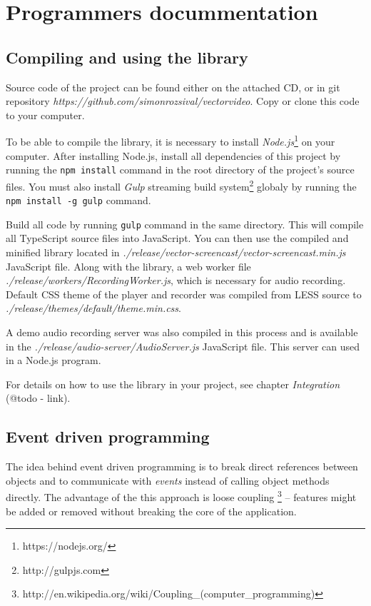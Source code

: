 \chapter{Programmers docummentation}

\section{Compiling and using the library}

Source code of the project can be found either on the attached CD, or in git repository \textit{https://github.com/simonrozsival/vectorvideo}. Copy or clone this code to your computer.

To be able to compile the library, it is necessary to install \textit{Node.js}\footnote{https://nodejs.org/} on your computer. After installing Node.js, install all dependencies of this project by running the \verb|npm install| command in the root directory of the project's source files. You must also install \textit{Gulp} streaming build system\footnote{http://gulpjs.com} globaly by running the \verb|npm install -g gulp| command.

Build all code by running \verb|gulp| command in the same directory. This will compile all TypeScript source files into JavaScript. You can then use the compiled and minified library located in \textit{./release/vector-screencast/vector-screencast.min.js} JavaScript file. Along with the library, a web worker file \textit{./release/workers/RecordingWorker.js}, which is necessary for audio recording. Default CSS theme of the player and recorder was compiled from LESS source to \textit{./release/themes/default/theme.min.css}.

A demo audio recording server was also compiled in this process and is available in the \textit{./release/audio-server/AudioServer.js} JavaScript file. This server can used in a Node.js program.

For details on how to use the library in your project, see chapter \textit{Integration} (@todo - link).



\section{Event driven programming}
The idea behind event driven programming is to break direct references between objects and to communicate with \textit{events} instead of calling object methods directly. The advantage of the this approach is loose coupling \footnote{http://en.wikipedia.org/wiki/Coupling\_(computer\_programming)} -- features might be added or removed without breaking the core of the application.


